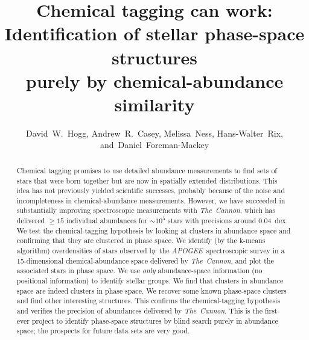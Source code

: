 \documentclass[12pt, letterpaper, preprint]{aastex}
\newcommand{\acronym}[1]{{\small{#1}}}
\newcommand{\project}[1]{\textsl{#1}}
\newcommand{\apogee}{\project{\acronym{APOGEE}}}
\newcommand{\thecannon}{\project{The~Cannon}}
\begin{document}
\sloppy\sloppypar

\title{Chemical tagging can work: \\
       Identification of stellar phase-space structures \\
       purely by chemical-abundance similarity}
\author{David~W.~Hogg,
        Andrew~R.~Casey,
        Melissa~Ness,
        Hans-Walter~Rix,
    and~Daniel~Foreman-Mackey}

\begin{abstract}
Chemical tagging promises to use detailed abundance measurements to find sets of stars that were born together but are now in spatially extended distributions.
This idea has not previously yielded scientific successes, probably because of the
noise and incompleteness in chemical-abundance measurements.
However, we have succeeded in substantially improving spectroscopic measurements with \thecannon,
which has delivered $\geq 15$ individual abundances for $\sim 10^5$ stars with precisions around 0.04~dex.
We test the chemical-tagging hypothesis by looking at clusters in abundance space
and confirming that they are clustered in phase space.
We identify (by the k-means algorithm) overdensities of stars observed by the \apogee\ spectroscopic survey
in a 15-dimensional chemical-abundance space delivered by \thecannon,
and plot the associated stars in phase space.
We use \emph{only} abundance-space information (no positional information) to identify stellar groups.
We find that clusters in abundance space are indeed clusters in phase space.
We recover some known phase-space clusters and find other interesting structures.
This confirms the chemical-tagging hypothesis and verifies the precision of abundances delivered by \thecannon.
This is the first-ever project to identify phase-space structures by blind search purely in abundance space;
the prospects for future data sets are very good.
\end{abstract}
\end{document}

